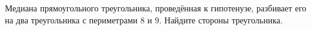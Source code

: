 \begin{ex}
	\begin{condition}
		Медиана прямоугольного треугольника, проведённая к гипотенузе, разбивает его на два треугольника с периметрами \( 8  \) и \( 9 \). Найдите стороны треугольника.
	\end{condition}
\end{ex}